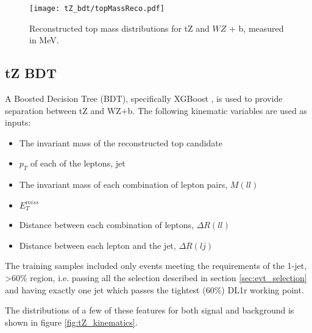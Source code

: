 \begin{figure}
    \centering
    \texttt{[image: tZ\_bdt/topMassReco.pdf]}
    \caption{Reconstructed top mass distributions for tZ and $WZ$ + b, measured in MeV.}
    \label{fig:topMass}
\end{figure}

\subsection{tZ BDT}
\label{subsec:tZ_bdt}
 
A Boosted Decision Tree (BDT), specifically XGBoost \cite{xgboost_cite}, is used to provide separation between tZ and WZ+b. The following kinematic variables are used as inputs:
 
 \begin{itemize}
     \item The invariant mass of the reconstructed top candidate
     \item $p_T$ of each of the leptons, jet
     \item The  invariant mass of each combination of lepton pairs, $M(ll)$
     \item $E_T^{miss}$
     \item Distance between each combination of leptons, $\Delta R (ll)$
     \item Distance between each lepton and the jet, $\Delta R (lj)$
 \end{itemize}
 
The training samples included only events meeting the requirements of the 1-jet, >60\% region, i.e. passing all the selection described in section \ref{sec:evt_selection} and having exactly one jet which passes the tightest (60\%) DL1r working point.
 
The distributions of a few of these features for both signal and background is shown in figure \ref{fig:tZ_kinematics}.
 

